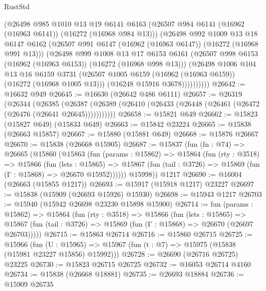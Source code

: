 \begin{lexlean}{RustStd}
\begin{coremodule}
              (@26498
                @985
                @1010
                @13
                @19
                @6141
                @6163
                (@26507 @984 @6141 (@16962 (@16963 @6141)) (@16272 (@16968 @984 @13)))
                (@26498
                  @992
                  @1009
                  @13
                  @18
                  @6147
                  @6162
                  (@26507 @991 @6147 (@16962 (@16963 @6147)) (@16272 (@16968 @991 @13)))
                  (@26498
                    @999
                    @1008
                    @13
                    @17
                    @6153
                    @6161
                    (@26507 @998 @6153 (@16962 (@16963 @6153)) (@16272 (@16968 @998 @13)))
                    (@26498
                      @1006
                      @104
                      @13
                      @16
                      @6159
                      @3731
                      (@26507 @1005 @6159 (@16962 (@16963 @6159)) (@16272 (@16968 @1005 @13)))
                      (@16248 @15916 @3678))))))))))
@26642 := @16632 @949
@26645 := @16630 (@26642 @486 @6111)
@26657 := @26319
    (@26344
      (@26385
        (@26387 (@26389 (@26410 (@26433 (@26448 (@26461 (@26472 (@26476 (@26641 @26645)))))))))))
@26658 := @15821 @649
@26662 := @15823 (@15827 @649) (@15833 @649)
@26663 := @15842 @23224
@26665 := @15838 (@26663 @15857)
@26667 := @15880 (@15881 @649)
@26668 := @15876 @26667
@26670 := @15838 (@26668 @15905)
@26687 := @15837
    (fun (fn : @74) =>
    @26665
      (@15860
        (@15863
          (fun (params : @15862) =>
          @15864
            (fun (rty : @3518) =>
            @15866
              (fun (lets : @15865) =>
              @15867 (fun (tail : @3726) => @15869 (fun (Γ : @15868) => @26670 @15952))))))
        @15998))
    @1217
@26690 := @16004 (@26663 (@15855 @1217))
@26693 := @15917 (@15918 @1217) @23227
@26697 := @15838 (@15909 (@26693 @15926) @15930)
@26698 := @15943 @1217
@26703 := @15940 (@15942 @26698 @23230 @15898 @15900)
@26714 := fun (params : @15862) =>
  @15864
    (fun (rty : @3518) =>
    @15866
      (fun (lets : @15865) =>
      @15867 (fun (tail : @3726) => @15869 (fun (Γ : @15868) => @26670 (@26697 @26703)))))
@26715 := @15863 @26714
@26716 := @15860 @26715
@26725 := @15966
    (fun (U : @15965) => @15967 (fun (t : @7) => @15975 (@15838 (@15981 @23227 @15856) @15992)))
@26728 := @26690 (@26716 @26725) @23225
@26730 := @15823 @26715 @26725
@26732 := @16053 @26714 @4160
@26734 := @15838 (@26668 @18881)
@26735 := @26693 @18884
@26736 := @15909 @26735

\end{coremodule}
\end{lexlean}
